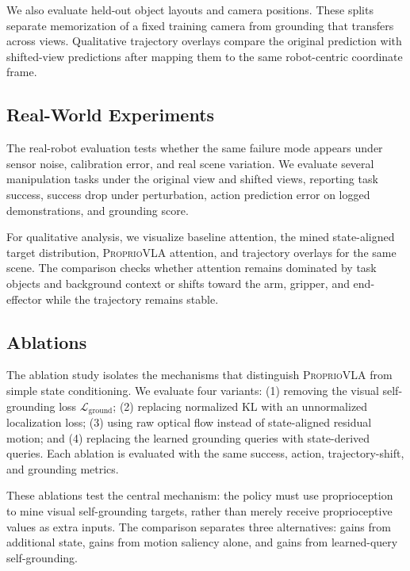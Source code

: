 We also evaluate held-out object layouts and camera positions. These splits
separate memorization of a fixed training camera from grounding that transfers
across views. Qualitative trajectory overlays compare the original prediction
with shifted-view predictions after mapping them to the same robot-centric
coordinate frame.

\subsection{Real-World Experiments}

The real-robot evaluation tests whether the same failure mode appears under
sensor noise, calibration error, and real scene variation. We evaluate several
manipulation tasks under the original view and shifted views, reporting task
success, success drop under perturbation, action prediction error on logged
demonstrations, and grounding score.

For qualitative analysis, we visualize baseline attention, the mined
state-aligned target distribution, \textsc{ProprioVLA} attention, and trajectory
overlays for the same scene. The comparison checks whether attention remains
dominated by task objects and background context or shifts toward the arm,
gripper, and end-effector while the trajectory remains stable.

\subsection{Ablations}

The ablation study isolates the mechanisms that distinguish
\textsc{ProprioVLA} from simple state conditioning. We evaluate four variants:
(1) removing the visual self-grounding loss \(\mathcal{L}_{\mathrm{ground}}\);
(2) replacing normalized KL with an unnormalized localization loss; (3) using
raw optical flow instead of state-aligned residual motion; and (4) replacing
the learned grounding queries with state-derived queries. Each ablation is
evaluated with the same success, action, trajectory-shift, and grounding
metrics.

These ablations test the central mechanism: the policy must use proprioception
to mine visual self-grounding targets, rather than merely receive
proprioceptive values as extra inputs. The comparison separates three
alternatives: gains from additional state, gains from motion saliency alone,
and gains from learned-query self-grounding.
